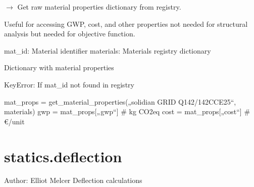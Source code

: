 \documentclass[a4paper,11pt,german]{sphinxmanual}
\begin{document}
\begin{fulllineitems}
\label{\detokenize{api/analysis_core:core.analysis_core.material_methods.get_material_properties}}
\pysigstartsignatures
\pysiglinewithargsret
{}
{\sphinxparamcomma {}}
{{ $\rightarrow$ }}
\pysigstopsignatures
\sphinxAtStartPar
Get raw material properties dictionary from registry.

\sphinxAtStartPar
Useful for accessing GWP, cost, and other properties not needed
for structural analysis but needed for objective function.
\begin{description}
\sphinxAtStartPar
mat\_id: Material identifier
materials: Materials registry dictionary

\sphinxAtStartPar
Dictionary with material properties

\sphinxAtStartPar
KeyError: If mat\_id not found in registry

\sphinxAtStartPar
mat\_props = get\_material\_properties(„solidian GRID Q142/142\sphinxhyphen{}CCE\sphinxhyphen{}25“, materials)
gwp = mat\_props{[}„gwp“{]}  \# kg CO2\sphinxhyphen{}eq
cost = mat\_props{[}„cost“{]}  \# €/unit

\end{description}

\end{fulllineitems}



\section{statics.deflection}
\label{\detokenize{api/analysis_core:module-core.analysis_core.statics.deflection}}\label{\detokenize{api/analysis_core:statics-deflection}}
\sphinxAtStartPar
Author: Elliot Melcer
Deflection calculations
\end{document}
